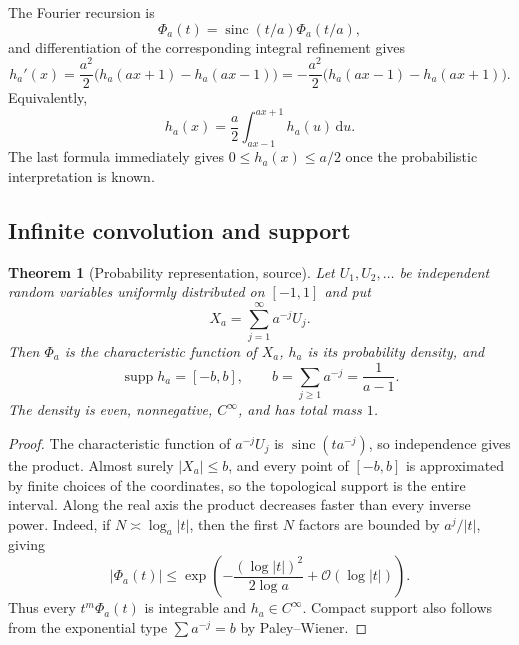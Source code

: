 \documentclass[11pt,oneside]{article}
\newtheorem{theorem}{Theorem}[section]
\theoremstyle{definition}
\theoremstyle{remark}
\newcommand{\sinc}{\operatorname{sinc}}
\newcommand{\dd}{\,\mathrm d}
\newcommand{\bigO}{\mathcal O}
\newcommand{\supp}{\operatorname{supp}}
\begin{document}
The Fourier recursion is
\begin{equation}
 \Phi_a(t)=\sinc(t/a)\Phi_a(t/a),
 \tag{S3.28}
 \label{eq:ha-fourier-refinement}
\end{equation}
and differentiation of the corresponding integral refinement gives
\begin{equation}
 h_a'(x)=\frac{a^2}{2}\bigl(h_a(ax+1)-h_a(ax-1)\bigr)
       =-\frac{a^2}{2}\bigl(h_a(ax-1)-h_a(ax+1)\bigr).
 \tag{S3.23}
 \label{eq:ha-diffeq}
\end{equation}
Equivalently,
\begin{equation}
 h_a(x)=\frac a2\int_{ax-1}^{ax+1}h_a(u)\dd u.
 \label{eq:ha-integral-refinement}
\end{equation}
The last formula immediately gives $0\le h_a(x)\le a/2$ once the probabilistic
interpretation is known.

\subsection{Infinite convolution and support}

\begin{theorem}[Probability representation, source]
\label{thm:probability-ha}
Let $U_1,U_2,\ldots$ be independent random variables uniformly distributed on $[-1,1]$ and
put
\begin{equation}
 X_a=\sum_{j=1}^{\infty}a^{-j}U_j.
 \tag{S3.26}
 \label{eq:Xa}
\end{equation}
Then $\Phi_a$ is the characteristic function of $X_a$, $h_a$ is its probability density,
and
\begin{equation}
 \supp h_a=[-b,b],\qquad b=\sum_{j\ge1}a^{-j}=\frac1{a-1}.
 \tag{S3.27}
 \label{eq:ha-support}
\end{equation}
The density is even, nonnegative, $C^\infty$, and has total mass $1$.
\end{theorem}

\begin{proof}
The characteristic function of $a^{-j}U_j$ is $\sinc(ta^{-j})$, so independence gives the
product.  Almost surely $|X_a|\le b$, and every point of $[-b,b]$ is approximated by finite
choices of the coordinates, so the topological support is the entire interval.  Along the
real axis the product decreases faster than every inverse power.  Indeed, if
$N\asymp\log_a|t|$, then the first $N$ factors are bounded by $a^j/|t|$, giving
\begin{equation}
 |\Phi_a(t)|\le
 \exp\!\left(-\frac{(\log|t|)^2}{2\log a}+\bigO(\log|t|)\right).
 \label{eq:lognormal-fourier-bound}
\end{equation}
Thus every $t^m\Phi_a(t)$ is integrable and $h_a\in C^\infty$.  Compact support also follows
from the exponential type $\sum a^{-j}=b$ by Paley--Wiener.
\end{proof}
\end{document}
